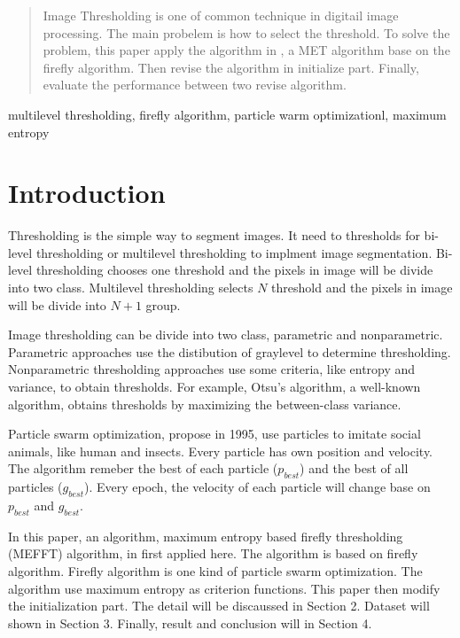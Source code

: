 \documentclass[conference]{IEEEtran}
\begin{document}


\begin{abstract}
Image Thresholding is one of common technique in digitail image processing. The main probelem is how to select the threshold. To solve the problem, this paper apply the algorithm in \cite{b1}, a MET algorithm base on the firefly algorithm. Then revise the algorithm in initialize part. Finally, evaluate the performance between two revise algorithm.
\end{abstract}

\begin{IEEEkeywords}
multilevel thresholding, firefly algorithm, particle warm optimizationl, maximum entropy
\end{IEEEkeywords}

\section{Introduction}
Thresholding is the simple way to segment images. It need to thresholds for bi-level thresholding or multilevel thresholding to implment image segmentation. Bi-level thresholding chooses one threshold and the pixels in image will be divide into two class. Multilevel thresholding selects $N$ threshold and the pixels in image will be divide into $N+1$ group.

Image thresholding can be divide into two class, parametric and nonparametric. Parametric approaches use the distibution of graylevel to determine thresholding. Nonparametric thresholding approaches use some criteria, like entropy and variance, to obtain thresholds. For example, Otsu's algorithm, a well-known algorithm, obtains thresholds by maximizing the between-class variance.

Particle swarm optimization, propose in 1995, use particles to imitate social animals, like human and insects. Every particle has own position and velocity. The algorithm remeber the best of each particle ($p_{best}$) and the best of all particles ($g_{best}$). Every epoch, the velocity of each particle will change base on $p_{best}$ and $g_{best}$.

In this paper, an algorithm, maximum entropy based firefly thresholding (MEFFT) algorithm, in \cite{b1} first applied here. The algorithm is based on firefly algorithm. Firefly algorithm is one kind of particle swarm optimization. The algorithm use maximum entropy as criterion functions. This paper then modify the initialization part. The detail will be discaussed in Section 2. Dataset will shown in Section 3. Finally, result and conclusion will in Section 4.
\end{document}

